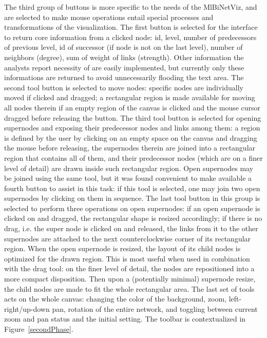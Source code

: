 \documentclass[runningheads]{llncs}
\begin{document}
The third group of buttons is more specific to the needs of the MlBiNetViz, and
are selected to make mouse operations entail special processes and transformations of the visualization.
The first button is selected for the interface to return core information from a clicked node:
id, level, number of predecessors of previous level, id of successor (if node is not on the last level),
number of neighbors (degree), sum of weight of links (strength).
Other information the analysts report necessity of are easily implemented, but currently only these informations
are returned to avoid unnecessarily flooding the text area.
The second tool button is selected to move nodes: specific nodes are individually moved if clicked and dragged;
a rectangular region is made available for moving all nodes therein if an empty region of the canvas
is clicked and the mouse cursor dragged before releasing the button.
The third tool button is selected for opening supernodes and exposing their predecessor nodes and links among them:
a region is defined by the user by clicking on an empty space on the canvas and dragging the mouse before releasing,
the supernodes therein are joined into a rectangular region that contains all of them,
and their predecessor nodes (which are on a finer level of detail) are drawn inside such rectangular region.
Open supernodes may be joined using the same tool, but it was found convenient to make available a
fourth button to assist in this task: if this tool is selected, one may join two open supernodes by
clicking on them in sequence.
The last tool button in this group is selected to perform three operations on open supernodes:
if an open supernode is clicked on and dragged, the rectangular shape is resized accordingly;
if there is no drag, i.e. the super node is clicked on and released, the links from it to the other
supernodes are attached to the next counterclockwise corner of its rectangular region.
When the open supernode is resized, the layout of its child nodes is optimized for the drawn region.
This is most useful when used in combination with the drag tool:
on the finer level of detail, the nodes are repositioned into a more compact disposition.
Then upon a (potentially minimal) supernode
resize, the child nodes are made to fit the whole rectangular area.
The last set of tools acts on the whole canvas:
changing the color of the background, zoom, left-right/up-down pan,
rotation of the entire network,
and toggling between current zoom and pan status and the initial setting.
The toolbar is contextualized in Figure~\ref{secondPhase}.
\end{document}

